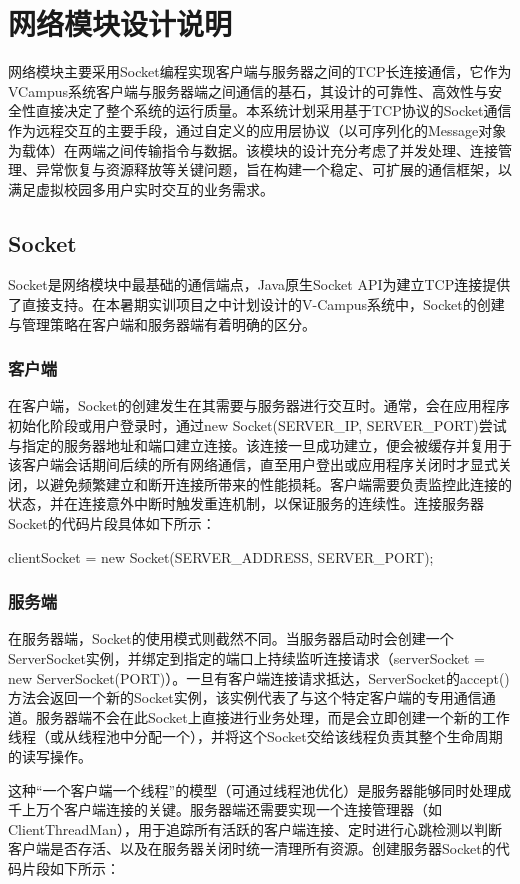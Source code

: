 \ifx\maindoc\undefined
{}
\fi

\section{网络模块设计说明}
网络模块主要采用Socket编程实现客户端与服务器之间的TCP长连接通信，它作为VCampus系统客户端与服务器端之间通信的基石，其设计的可靠性、高效性与安全性直接决定了整个系统的运行质量。本系统计划采用基于TCP协议的Socket通信作为远程交互的主要手段，通过自定义的应用层协议（以可序列化的Message对象为载体）在两端之间传输指令与数据。该模块的设计充分考虑了并发处理、连接管理、异常恢复与资源释放等关键问题，旨在构建一个稳定、可扩展的通信框架，以满足虚拟校园多用户实时交互的业务需求。
\subsection{Socket}
Socket是网络模块中最基础的通信端点，Java原生Socket API为建立TCP连接提供了直接支持。在本暑期实训项目之中计划设计的V-Campus系统中，Socket的创建与管理策略在客户端和服务器端有着明确的区分。
\subsubsection{客户端}
在客户端，Socket的创建发生在其需要与服务器进行交互时。通常，会在应用程序初始化阶段或用户登录时，通过new Socket(SERVER_IP, SERVER_PORT)尝试与指定的服务器地址和端口建立连接。该连接一旦成功建立，便会被缓存并复用于该客户端会话期间后续的所有网络通信，直至用户登出或应用程序关闭时才显式关闭，以避免频繁建立和断开连接所带来的性能损耗。客户端需要负责监控此连接的状态，并在连接意外中断时触发重连机制，以保证服务的连续性。连接服务器Socket的代码片段具体如下所示：

clientSocket = new Socket(SERVER_ADDRESS, SERVER_PORT);
\subsubsection{服务端}
在服务器端，Socket的使用模式则截然不同。当服务器启动时会创建一个ServerSocket实例，并绑定到指定的端口上持续监听连接请求（serverSocket = new ServerSocket(PORT)）。一旦有客户端连接请求抵达，ServerSocket的accept()方法会返回一个新的Socket实例，该实例代表了与这个特定客户端的专用通信通道。服务器端不会在此Socket上直接进行业务处理，而是会立即创建一个新的工作线程（或从线程池中分配一个），并将这个Socket交给该线程负责其整个生命周期的读写操作。

这种“一个客户端一个线程”的模型（可通过线程池优化）是服务器能够同时处理成千上万个客户端连接的关键。服务器端还需要实现一个连接管理器（如ClientThreadMan），用于追踪所有活跃的客户端连接、定时进行心跳检测以判断客户端是否存活、以及在服务器关闭时统一清理所有资源。创建服务器Socket的代码片段如下所示：

